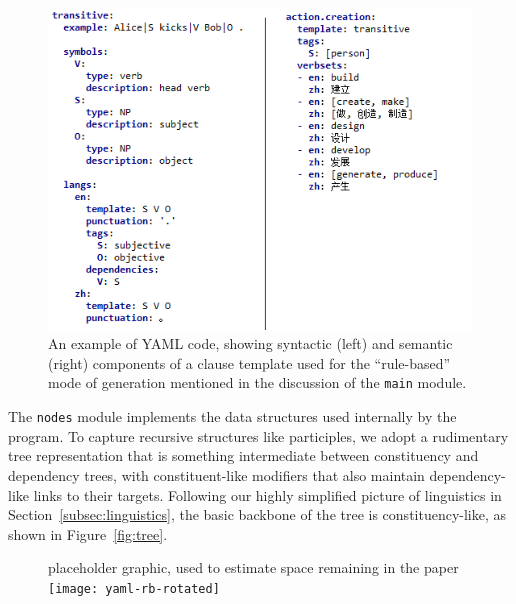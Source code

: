 {%
\begin{figure}[ht]
    \centering
    \includegraphics{yaml-rb}
    \caption{An example of YAML code, showing syntactic (left) and semantic (right) components of a clause template used for the ``rule-based'' mode of generation mentioned in the discussion of the {\small \tt main} module.}
    \label{fig:yaml-rb}
\end{figure}
 

The {\small \tt nodes} module implements the data structures used internally by the program.
To capture recursive structures like participles, we adopt a rudimentary tree representation that is something intermediate between constituency and dependency trees, with constituent-like modifiers that also maintain dependency-like links to their targets.
Following our highly simplified picture of linguistics in Section~\ref{subsec:linguistics}, the basic backbone of the tree is constituency-like, as shown in Figure~\ref{fig:tree}.

\begin{figure}[ht]
    \centering
    placeholder graphic, used to estimate space remaining in the paper
    \texttt{[image: yaml-rb-rotated]}
        

\end{figure}}
